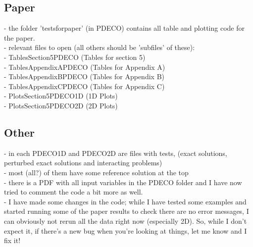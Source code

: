 \documentclass[11pt, a4paper]{article}
\theoremstyle{definition}
\begin{document}
\subsection*{Paper}
- the folder 'testsforpaper' (in PDECO) contains all table and plotting code for the paper. \\
- relevant files to open (all others should be 'subfiles' of these):\\
   - TablesSection5PDECO (Tables for section 5)\\
   - TablesAppendixAPDECO (Tables for Appendix A)\\
   - TablesAppendixBPDECO (Tables for Appendix B)\\
   - TablesAppendixCPDECO (Tables for Appendix C)\\
   
   - PlotsSection5PDECO1D (1D Plots)\\
   - PlotsSection5PDECO2D (2D Plots)\\
\subsection*{Other}
- in each PDECO1D and PDECO2D are files with tests, (exact solutions, perturbed exact solutions and interacting problems)\\
- most (all?) of them have some reference solution at the top \\
- there is a PDF with all input variables in the PDECO folder and I have now tried to comment the code a bit more as well.\\
- I have made some changes in the code; while I have tested some examples and started running some of the paper results to check there are no error messages, I can obviously not rerun all the data right now (especially 2D). So, while I don't expect it, if there's a new bug when you're looking at things, let me know and I fix it!  
   
   
\end{document}

